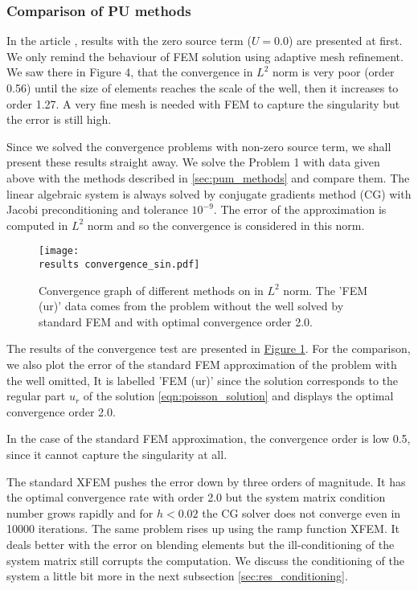 \documentclass[FM,Dis]{tulthesis}
\newcommand{\fig}[1]{\hyperref[#1]{Figure \ref{#1}}}
\newcommand{\results}{results/}
\begin{document}
\subsubsection{Comparison of PU methods} \label{sec:res_comparison}

In the article \cite{exner_2016}, results with the zero source term ($U=0.0$) are presented at first. We only
remind the behaviour of FEM solution using adaptive mesh refinement.
We saw there in Figure 4, that the convergence in $L^2$ norm is very poor (order 0.56) until the size of elements 
reaches the scale of the well, then it increases to order 1.27. A very fine mesh is needed with FEM to capture 
the singularity but the error is still high.

Since we solved the convergence problems with non-zero source term, we shall present these results straight away.
We solve the Problem 1 with data given above with the methods described in \ref{sec:pum_methods} and compare them.
The linear algebraic system is always solved by conjugate gradients method (CG) with Jacobi preconditioning 
and tolerance $10^{-9}$. The error of the approximation is computed in $L^2$ norm and so the convergence is
considered in this norm.

\begin{figure}[!htb]
  \centering    
  \texttt{[image: \\results convergence\_sin.pdf]}
  \caption[Convergence graph]{Convergence graph of different methods on in $L^2$ norm. The 'FEM (ur)'
  data comes from the problem without the well solved by standard FEM and with optimal convergence order 2.0.}
  \label{fig:convergence_sin}
\end{figure}

The results of the convergence test are presented in \fig{fig:convergence_sin}.
For the comparison, we also plot the error of the standard FEM approximation of the problem with the well omitted, 
It is labelled 'FEM (ur)' since the solution corresponds to the regular part $u_r$ of the solution \eqref{eqn:poisson_solution}  
and displays the optimal convergence order 2.0.

In the case of the standard FEM approximation, the convergence order is low 0.5, since it cannot capture the 
singularity at all.

The standard XFEM pushes the error down by three orders of magnitude. It has the optimal convergence rate with order 2.0 but the system
matrix condition number grows rapidly and for $h<0.02$ the CG solver does not converge even in 10000 iterations. The same
problem rises up using the ramp function XFEM. It deals better with the error on blending elements but the
ill-conditioning of the system matrix still corrupts the computation. We discuss the conditioning of the system 
a little bit more in the next subsection \ref{sec:res_conditioning}.
\end{document}
